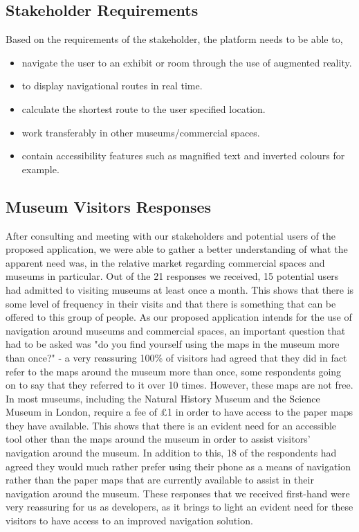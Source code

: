 \subsection{Stakeholder Requirements}
Based on the requirements of the stakeholder, the platform needs to be able to,

\begin{itemize}
    \item navigate the user to an exhibit or room through the use of augmented reality.
    \item to display navigational routes in real time.
    \item calculate the shortest route to the user specified location. 
    \item work transferably in other museums/commercial spaces.
    \item contain accessibility features such as magnified text and inverted colours for example.
\end{itemize}

\subsection{Museum Visitors Responses}
After consulting and meeting with our stakeholders and potential users of the proposed application, we were able to gather a better understanding of what the apparent need was, in the relative market regarding commercial spaces and museums in particular. Out of the 21 responses we received, 15 potential users had admitted to visiting museums at least once a month. This shows that there is some level of frequency in their visits and that there is something that can be offered to this group of people. As our proposed application intends for the use of navigation around museums and commercial spaces, an important question that had to be asked was "do you find yourself using the maps in the museum more than once?" - a very reassuring 100\% of visitors had agreed that they did in fact refer to the maps around the museum more than once, some respondents going on to say that they referred to it over 10 times. However, these maps are not free. In most museums, including the Natural History Museum and the Science Museum in London, require a fee of £1 in order to have access to the paper maps they have available. This shows that there is an evident need for an accessible tool other than the maps around the museum in order to assist visitors' navigation around the museum. In addition to this, 18 of the respondents had agreed they would much rather prefer using their phone as a means of navigation rather than the paper maps that are currently available to assist in their navigation around the museum. These responses that we received first-hand were very reassuring for us as developers, as it brings to light an evident need for these visitors to have access to an improved navigation solution.

